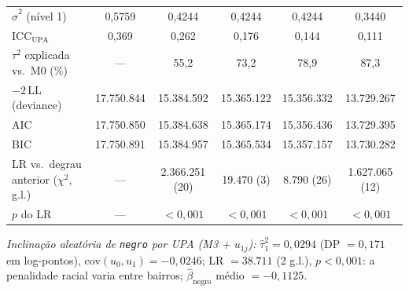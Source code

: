 \begin{table}[htbp]
{\begin{tabular}{lccccc}
$\hat\sigma^2$ (nível 1) & 0,5759 & 0,4244 & 0,4244 & 0,4244 & 0,3440 \\
ICC$_{\text{UPA}}$ & 0,369 & 0,262 & 0,176 & 0,144 & 0,111 \\
$\tau^2$ explicada vs.\ M0 (\%) & --- & 55,2 & 73,2 & 78,9 & 87,3 \\
$-2\,$LL (deviance) & 17.750.844 & 15.384.592 & 15.365.122 & 15.356.332 & 13.729.267 \\
AIC & 17.750.850 & 15.384.638 & 15.365.174 & 15.356.436 & 13.729.395 \\
BIC & 17.750.891 & 15.384.957 & 15.365.534 & 15.357.157 & 13.730.282 \\
LR vs.\ degrau anterior ($\chi^2$, g.l.) & --- & 2.366.251 (20) & 19.470 (3) & 8.790 (26) & 1.627.065 (12) \\
$p$ do LR & --- & $<0{,}001$ & $<0{,}001$ & $<0{,}001$ & $<0{,}001$ \\
\bottomrule
\end{tabular}}

\noindent\footnotesize\emph{Inclinação aleatória de \texttt{negro} por UPA (M3 + $u_{1j}$):} $\hat\tau^2_{1} = 0,0294$ (DP $= 0,171$ em log-pontos), cov$(u_0,u_1) = −0,0246$; LR $= 38.711$ (2 g.l.), $p<0{,}001$: a penalidade racial varia entre bairros; $\hat\beta_{\text{negro}}$ médio $= −0,1125$.
\normalsize
\end{table}
